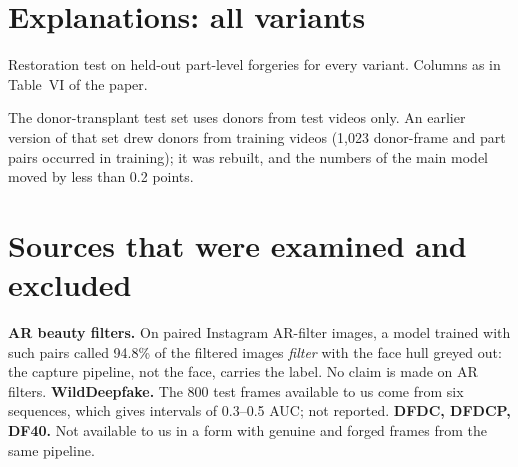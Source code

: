 \documentclass[10pt]{article}
\begin{document}
\section{Explanations: all variants}
\begin{table}[h]
\centering
\caption{Restoration test on held-out part-level forgeries for every variant. Columns as in Table~VI of the paper.}
\label{tab:cgd_all}
\footnotesize
\begin{adjustbox}{max width=\linewidth}\end{adjustbox}
\end{table}
The donor-transplant test set uses donors from test videos only. An earlier version of that set drew donors from
training videos (1,023 donor-frame and part pairs occurred in training); it was rebuilt, and the numbers of the main
model moved by less than 0.2 points.

\section{Sources that were examined and excluded}
\textbf{AR beauty filters.} On paired Instagram AR-filter images, a model trained with such pairs called 94.8\% of the
filtered images \emph{filter} with the face hull greyed out: the capture pipeline, not the face, carries the label. No
claim is made on AR filters.
\textbf{WildDeepfake.} The 800 test frames available to us come from six sequences, which gives intervals of
0.3--0.5 AUC; not reported.
\textbf{DFDC, DFDCP, DF40.} Not available to us in a form with genuine and forged frames from the same pipeline.



\end{document}
